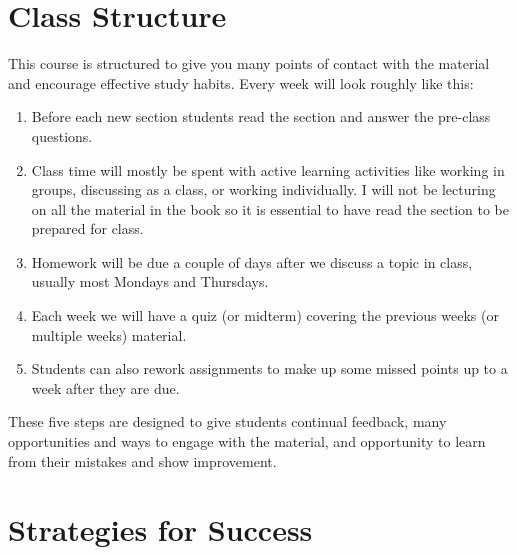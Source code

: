 \documentclass[11pt]{article}
\begin{document}
\section*{Class Structure} This course is structured to give you many points of contact with the material and encourage effective study habits. Every week will look roughly like this:
\begin{enumerate}
    \item Before each new section students read the section and answer the pre-class questions.
    \item Class time will mostly be spent with active learning activities like working in groups, discussing as a class, or working individually. I will not be lecturing on all the material in the book so it is essential to have read the section to be prepared for class.
    \item Homework will be due a couple of days after we discuss a topic in class, usually most Mondays and Thursdays.
    \item Each week we will have a quiz (or midterm) covering the previous weeks (or multiple weeks) material.
    \item Students can also rework assignments to make up some missed points up to a week after they are due. 
\end{enumerate}
These five steps are designed to give students continual feedback, many opportunities and ways to engage with the material, and opportunity to learn from their mistakes and show improvement.

\section*{Strategies for Success}
\end{document}
